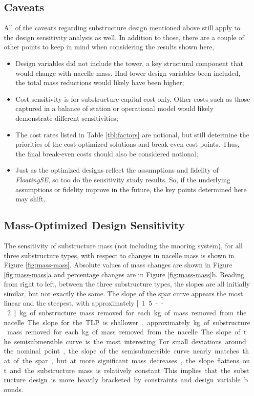 \subsection{Caveats}
All of the caveats regarding substructure design mentioned above still
apply to the design sensitivity analysis as well.  In addition to those,
there are a couple of other points to keep in mind when considering the
results shown here,
\begin{itemize}
\item Design variables did not include the tower, a key structural
  component that would change with nacelle mass.  Had tower design
  variables been included, the total mass reductions would likely have
  been higher;
\item Cost sensitivity is for substructure capital cost only.  Other
  costs such as those captured in a balance of station or operational
  model would likely demonstrate different sensitivities;
\item The cost rates listed in Table \ref{tbl:factors} are notional,
  but still determine the priorities of the cost-optimized solutions and
  break-even cost points.  Thus, the final break-even costs should also
  be considered notional;
\item Just as the optimized designs reflect the assumptions and
  fidelity of \textit{FloatingSE}, so too do the sensitivity study
  results.  So, if the underlying assumptions or fidelity improve in
  the future, the key points determined here may shift.
\end{itemize}


\subsection{Mass-Optimized Design Sensitivity}
The sensitivity of substructure mass (not including the mooring system),
for all three substructure types, with respect to changes in nacelle
mass is shown in Figure \ref{fig:mass-mass}.  Absolute values of mass
changes are shown in Figure \ref{fig:mass-mass}a and percentage changes
are in Figure \ref{fig:mass-mass}b.  Reading from right to left, between
the three substructure types, the slopes are all initially similar, but
not exactly the same.  The slope of the spar curve appears the most
linear and the steepest, with approximately \unit[1.5--2]{kg} of
substructure mass removed for each \unit[1]{kg} of mass removed from the
nacelle.  The slope for the TLP is shallower, approximately
\unit[1]{kg} of substructure mass removed for each \unit[1]{kg} of
mass removed from the nacelle.  The slope of the semisubmersible curve is
the most interesting.  For small deviations around the nominal point,
the slope of the semisubmersible curve nearly matches that of the spar,
but at more significant mass decreases, the slope flattens out and the
substructure mass is relatively constant.  This implies that the
substructure design is more heavily bracketed by constraints and design
variable bounds.

